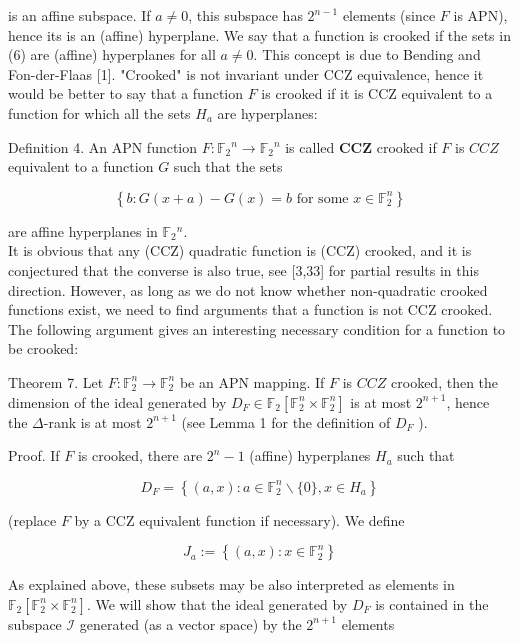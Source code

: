 \documentclass[10pt]{article}
\begin{document}
is an affine subspace. If $a \neq 0$, this subspace has $2^{n-1}$ elements (since $F$ is APN), hence its is an (affine) hyperplane. We say that a function is crooked if the sets in (6) are (affine) hyperplanes for all $a \neq 0$. This concept is due to Bending and Fon-der-Flaas [1]. "Crooked" is not invariant under CCZ equivalence, hence it would be better to say that a function $F$ is crooked if it is CCZ equivalent to a function for which all the sets $H_{a}$ are hyperplanes:

Definition 4. An APN function $F: \mathbb{F}_{2}{ }^{n} \rightarrow \mathbb{F}_{2}{ }^{n}$ is called $\mathbf{C C Z}$ crooked if $F$ is $C C Z$ equivalent to a function $G$ such that the sets

$$
\left\{b: G(x+a)-G(x)=b \text { for some } x \in \mathbb{F}_{2}^{n}\right\}
$$

are affine hyperplanes in $\mathbb{F}_{2}{ }^{n}$.\\[0pt]
It is obvious that any (CCZ) quadratic function is (CCZ) crooked, and it is conjectured that the converse is also true, see [3,33] for partial results in this direction. However, as long as we do not know whether non-quadratic crooked functions exist, we need to find arguments that a function is not CCZ crooked. The following argument gives an interesting necessary condition for a function to be crooked:

Theorem 7. Let $F: \mathbb{F}_{2}^{n} \rightarrow \mathbb{F}_{2}^{n}$ be an APN mapping. If $F$ is $C C Z$ crooked, then the dimension of the ideal generated by $D_{F} \in \mathbb{F}_{2}\left[\mathbb{F}_{2}^{n} \times \mathbb{F}_{2}^{n}\right]$ is at most $2^{n+1}$, hence the $\Delta$-rank is at most $2^{n+1}$ (see Lemma 1 for the definition of $D_{F}$ ).

Proof. If $F$ is crooked, there are $2^{n}-1$ (affine) hyperplanes $H_{a}$ such that

$$
D_{F}=\left\{(a, x): a \in \mathbb{F}_{2}^{n} \backslash\{0\}, x \in H_{a}\right\}
$$

(replace $F$ by a CCZ equivalent function if necessary). We define

$$
J_{a}:=\left\{(a, x): x \in \mathbb{F}_{2}^{n}\right\}
$$

As explained above, these subsets may be also interpreted as elements in $\mathbb{F}_{2}\left[\mathbb{F}_{2}^{n} \times \mathbb{F}_{2}^{n}\right]$. We will show that the ideal generated by $D_{F}$ is contained in the subspace $\mathcal{I}$ generated (as a vector space) by the $2^{n+1}$ elements
\end{document}
